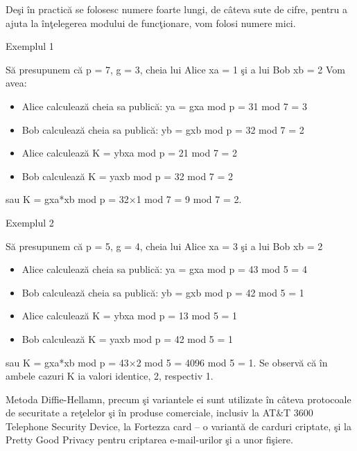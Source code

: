 \documentclass[12pt, a4paper, oneside, romanian]{teza-upb}
\begin{document}
Deşi în practică se folosesc numere foarte lungi, de câteva sute de cifre, pentru a ajuta la înţelegerea modului de funcţionare, vom folosi numere mici.
\vspace{1cm}

Exemplul 1

Să presupunem că p = 7, g = 3, cheia lui Alice xa = 1 şi a lui Bob xb = 2
Vom avea:
\begin{itemize}
 \item Alice calculează cheia sa publică: ya = gxa mod p = 31 mod 7 = 3
 \item Bob calculează cheia sa publică: yb = gxb mod p = 32 mod 7 = 2
 \item Alice calculează K = ybxa mod p = 21 mod 7 = 2
 \item Bob calculează K = yaxb mod p = 32 mod 7 = 2
\end{itemize}
sau
K = gxa*xb mod p = 32×1 mod 7 = 9 mod 7 = 2.
\vspace{1cm}

Exemplul 2

Să presupunem că p = 5, g = 4, cheia lui Alice xa = 3 şi a lui Bob xb = 2
\begin{itemize}
 \item Alice calculează cheia sa publică: ya = gxa mod p = 43 mod 5 = 4
 \item Bob calculează cheia sa publică: yb = gxb mod p = 42 mod 5 = 1
 \item Alice calculează K = ybxa mod p = 13 mod 5 = 1
 \item Bob calculează K = yaxb mod p = 42 mod 5 = 1
\end{itemize}
sau
K = gxa*xb mod p = 43×2 mod 5 = 4096 mod 5 = 1.
Se observă că în ambele cazuri K ia valori identice, 2, respectiv 1.

Metoda Diffie-Hellamn, precum şi variantele ei sunt utilizate în câteva protocoale de securitate a reţelelor şi în produse comerciale, inclusiv la AT\&T 3600 Telephone Security Device, la Fortezza card – o variantă de carduri criptate, şi la Pretty Good Privacy pentru criptarea e-mail-urilor şi a unor fişiere.
\newpage
\end{document}
